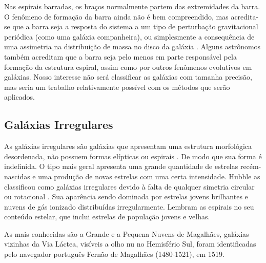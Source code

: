 Nas espirais barradas, os braços normalmente partem das extremidades da barra. O fenômeno de formação da barra ainda não é bem compreendido, mas acredita-se que a barra seja a resposta do sistema a um tipo de perturbação gravitacional periódica (como uma galáxia companheira), ou simplesmente a consequência de uma assimetria na distribuição de massa no disco da galáxia \cite{bergh1998galaxy}. Alguns astrônomos também acreditam que a barra seja pelo menos em parte responsável pela formação da estrutura espiral, assim como por outros fenômenos evolutivos em galáxias. Nosso interesse não será classificar as galáxias com tamanha precisão, mas seria um trabalho relativamente possível com os métodos que serão aplicados. 

\subsection{Galáxias Irregulares} 

As galáxias irregulares são galáxias que apresentam uma estrutura morfológica desordenada, não possuem formas elípticas ou espirais \cite{bergh1998galaxy}. De modo que sua forma é indefinida. O tipo mais geral apresenta uma grande quantidade de estrelas recém-nascidas e uma produção de novas estrelas com uma certa intensidade. Hubble as classificou como galáxias irregulares devido à falta de qualquer simetria circular ou rotacional \cite{bergh1998galaxy}. Sua aparência sendo dominada por estrelas jovens brilhantes e nuvens de gás ionizado distribuídas irregularmente\cite{extragalatic}. Lembram as espirais no seu conteúdo estelar, que inclui estrelas de população jovens e velhas. 

As mais conhecidas são a Grande e a Pequena Nuvens de Magalhães, galáxias vizinhas da Via Láctea, visíveis a olho nu no Hemisfério Sul, foram identificadas pelo navegador português Fernão de Magalhães (1480-1521), em 1519.  

